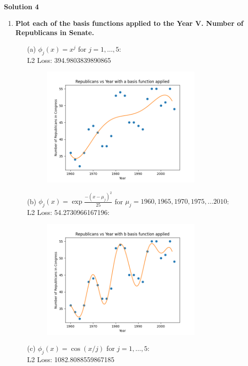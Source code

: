 \documentclass[submit]{harvardml}
\begin{document}
\newpage

\textbf{Solution 4}
\begin{enumerate}
    \item \textbf{Plot each of the basis functions applied to the Year V. Number of Republicans in Senate.}
    \begin{enumerate}
    	\item[(a)] $\phi_j(x) = x^j$ for $j=1, \ldots, 5$:\\
    	L2 Loss:  394.9803839890865 \\
    	\begin{figure}[H]
            \includegraphics[width=8cm]{hw1/T1P4_plots/plot1.png}
            \centering
        \end{figure}
        \item[(b)] $\phi_j(x) = \exp{\frac{-(x-\mu_j)^2}{25}}$ for $\mu_j=1960, 1965, 1970, 1975, \ldots 2010$: \\
        L2 Loss:  54.2730966167196:\\
        \begin{figure}[H]
            \includegraphics[width=8cm]{hw1/T1P4_plots/plot2.png}
            \centering
        \end{figure}
    	\item[(c)] $\phi_j(x) = \cos(x / j)$ for $j=1, \ldots, 5$: \\
    	L2 Loss:  1082.8088559867185 \\

\end{enumerate}
\end{enumerate}
\end{document}
